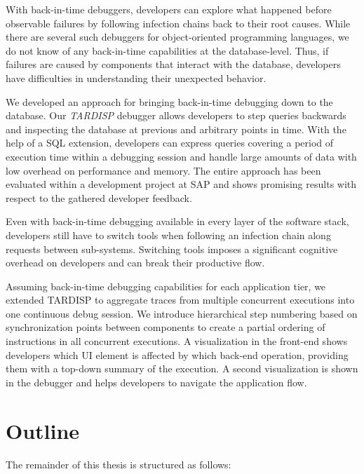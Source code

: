 With back-in-time debuggers, developers can explore what happened before observable failures by following infection chains back to their root causes. 
While there are several such debuggers for object-oriented programming languages, we do not know of any back-in-time capabilities at the database-level.
Thus, if failures are caused by components that interact with the database, developers have difficulties in understanding their unexpected behavior.

We developed an approach for bringing back-in-time debugging down to the database.
Our \emph{TARDISP} debugger allows developers to step queries backwards and inspecting the database at previous and arbitrary points in time. 
With the help of a SQL extension, developers can express queries covering a period of execution time within a debugging session and handle large amounts of data with low overhead on performance and memory. 
The entire approach has been evaluated within a development project at SAP and shows promising results with respect to the gathered developer feedback.


Even with back-in-time debugging available in every layer of the software stack, developers still have to switch tools when following an infection chain along requests between sub-systems.
Switching tools imposes a significant cognitive overhead on developers and can break their productive flow.

Assuming back-in-time debugging capabilities for each application tier, 
we extended TARDISP to aggregate traces from multiple concurrent executions into one continuous debug session.
We introduce hierarchical step numbering based on synchronization points between components to create a partial ordering of instructions in all concurrent executions.
A visualization in the front-end shows developers which UI element is affected by which back-end operation, providing them with a top-down summary of the execution.
A second visualization is shown in the debugger and helps developers to navigate the application flow.

\section{Outline}

The remainder of this thesis is structured as follows:

